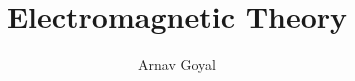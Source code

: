 

\title{Electromagnetic Theory}
\author{Arnav Goyal}

\def\myreferences{
\item Fundamentals of Applied Electromagnetics - 7e - T. Ulaby, U.Ravaioli
}


	\maketitle
	\tableofcontents
	\preface

